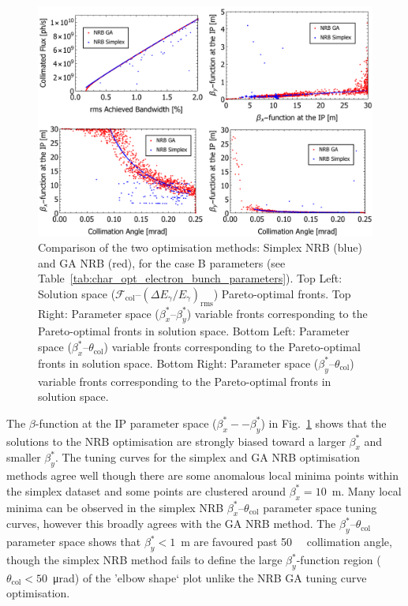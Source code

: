 \documentclass[../main.tex]{subfiles}
\begin{document}
\begin{figure}[!h]
\centering
\includegraphics[width=\textwidth]{Figures/Optimisation_and_Characterisation_of_Inverse_Compton_Scattering_Sources/CaseBoptcomp.pdf}
\caption{Comparison of the two optimisation methods: Simplex NRB (blue) and GA NRB (red), for the case B parameters (see Table~\ref{tab:char_opt_electron_bunch_parameters}). Top Left: Solution space ($\mathcal{F}_{\mathrm{col}}$--$\left(\Delta E_{\gamma}/E_{\gamma}\right)_{\mathrm{rms}}$) Pareto-optimal fronts. Top Right: Parameter space ($\beta_{x}^{*}$--$\beta_{y}^{*}$) variable fronts corresponding to the Pareto-optimal fronts in solution space. Bottom Left: Parameter space ($\beta_{x}^{*}$--$\theta_{\mathrm{col}}$) variable fronts corresponding to the Pareto-optimal fronts in solution space. Bottom Right: Parameter space ($\beta_{y}^{*}$--$\theta_{\mathrm{col}}$) variable fronts corresponding to the Pareto-optimal fronts in solution space.}
\label{fig:case_B_optimisation_comparison)}
\end{figure}

The $\beta$-function at the IP parameter space ($\beta_{x}^{*}--\beta_{y}^{*}$) in Fig.~\ref{fig:case_B_optimisation_comparison)} shows that the solutions to the NRB optimisation are strongly biased toward a larger $\beta_{x}^{*}$ and smaller $\beta_{y}^{*}$. The tuning curves for the simplex and GA NRB optimisation methods agree well though there are some anomalous local minima points within the simplex dataset and some points are clustered around $\beta_{x}^{*} = 10$~\si{\meter}. Many local minima can be observed in the simplex NRB $\beta_{x}^{*}$--$\theta_{\mathrm{col}}$ parameter space tuning curves, however this broadly agrees with the GA NRB method. The $\beta_{y}^{*}$--$\theta_{\mathrm{col}}$ parameter space shows that $\beta_{y}^{*} < 1$~\si{\meter} are favoured past 50~\si{\micro\radians} collimation angle, though the simplex NRB method fails to define the large $\beta_{y}^{*}$-function region ($\theta_{\mathrm{col}} < 50$~\si{\micro\radian}) of the 'elbow shape` plot unlike the NRB GA tuning curve optimisation. 
\end{document}
